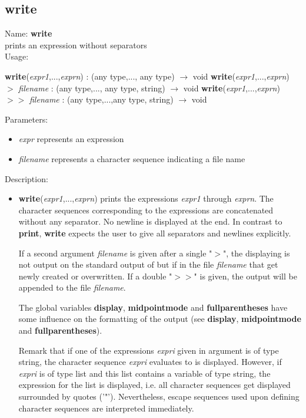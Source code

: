 \subsection{write}
\label{labwrite}
\noindent Name: \textbf{write}\\
prints an expression without separators\\
\noindent Usage: 
\begin{center}
\textbf{write}(\emph{expr1},...,\emph{exprn}) : (\textsf{any type},..., \textsf{any type}) $\rightarrow$ \textsf{void}
\textbf{write}(\emph{expr1},...,\emph{exprn}) $>$ \emph{filename} : (\textsf{any type},..., \textsf{any type}, \textsf{string}) $\rightarrow$ \textsf{void}
\textbf{write}(\emph{expr1},...,\emph{exprn}) $>>$ \emph{filename} : (\textsf{any type},...,\textsf{any type}, \textsf{string}) $\rightarrow$ \textsf{void}
\end{center}
Parameters: 
\begin{itemize}
\item \emph{expr} represents an expression
\item \emph{filename} represents a character sequence indicating a file name
\end{itemize}
\noindent Description: \begin{itemize}

\item \textbf{write}(\emph{expr1},...,\emph{exprn}) prints the expressions \emph{expr1} through
   \emph{exprn}. The character sequences corresponding to the expressions are
   concatenated without any separator. No newline is displayed at the
   end.  In contrast to \textbf{print}, \textbf{write} expects the user to give all
   separators and newlines explicitly.
    
   If a second argument \emph{filename} is given after a single "$>$", the
   displaying is not output on the standard output of \sollya but if in
   the file \emph{filename} that get newly created or overwritten. If a double
    "$>>$" is given, the output will be appended to the file \emph{filename}.
    
   The global variables \textbf{display}, \textbf{midpointmode} and \textbf{fullparentheses} have
   some influence on the formatting of the output (see \textbf{display},
   \textbf{midpointmode} and \textbf{fullparentheses}).
    
   Remark that if one of the expressions \emph{expri} given in argument is of
   type \textsf{string}, the character sequence \emph{expri} evaluates to is
   displayed. However, if \emph{expri} is of type \textsf{list} and this list
   contains a variable of type \textsf{string}, the expression for the list
   is displayed, i.e.  all character sequences get displayed surrounded
   by quotes ('"'). Nevertheless, escape sequences used upon defining
   character sequences are interpreted immediately.
\end{itemize}
